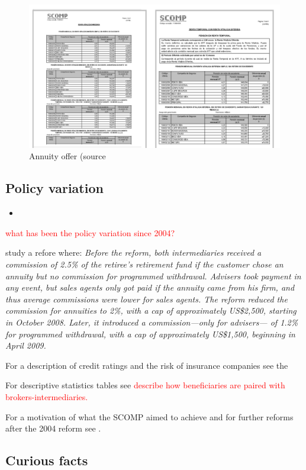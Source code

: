\documentclass[12pt]{article}
\theoremstyle{plain}
\theoremstyle{plain}
\begin{document}
\begin{figure}
    \centering
    \includegraphics[width=0.5\linewidth]{figures/offer_certificate.png}
    \caption{Annuity offer (source \textcite{boehm_intermediation_2024}}
    \label{fig:offer_ann2}
\end{figure}

\vspace{3cm}
\subsection{Policy variation}
\begin{itemize}
    \item \
\end{itemize}
\textcolor{red}{what has been the policy variation since 2004? }

\textcite{alcalde_intermediary_nodate} study a refore where: \textit{
Before the reform, both intermediaries received a commission of 2.5\% of the retiree’s retirement fund if the customer chose an annuity but no commission for programmed withdrawal. Advisers took payment in any event, but sales agents only got paid if the annuity came from his firm, and thus average commissions were lower for sales agents. The reform reduced the commission for annuities to 2\%, with a cap of approximately US\$2,500, starting in October 2008. Later, it introduced a commission—only for advisers— of 1.2\% for programmed withdrawal, with a cap of approximately US\$1,500, beginning in April 2009.}



For a description of credit ratings and the risk of insurance companies see the \textcite[p.5]{aryal_auctioning_2021}

For descriptive statistics tables see \textcite{aryal_auctioning_2021}
\textcolor{red}{describe how beneficiaries are paired with brokers-intermediaries.} 

For a motivation of what the SCOMP aimed to achieve and for further reforms after the 2004 reform see \textcite[section 3.2]{halcartegaray_efectos_2011}. 

\subsection{Curious facts}
\end{document}
